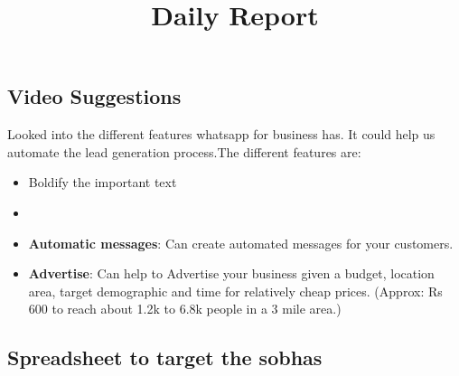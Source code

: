 \documentclass[12pt, a4paper]{article}
\begin{document}
\title{Daily Report}
\maketitle

\subsection{Video Suggestions}

Looked into the different features whatsapp for business has. It could help us automate the lead generation process.The different features are:

\begin{itemize}
    \item Boldify the important text
    \item
    \item \textbf{Automatic messages}: Can create automated messages for your customers.
    \item \textbf{Advertise}: Can help to Advertise your business given a budget, location area, target demographic and time for relatively cheap prices. (Approx: Rs 600 to reach about 1.2k to 6.8k people in a 3 mile area.)
\end{itemize}


\vspace{0.5cm}

\subsection{Spreadsheet to target the sobhas}


\vspace{0.25cm}
\end{document}
